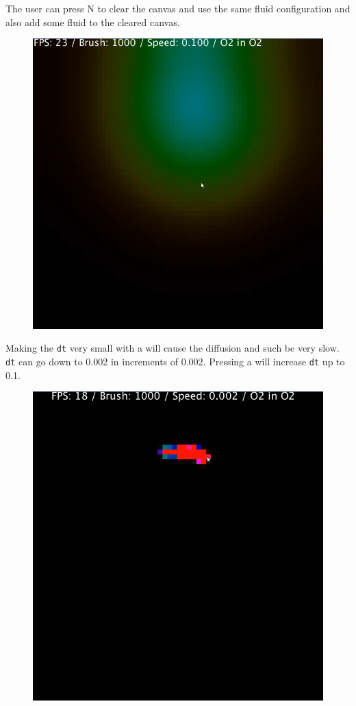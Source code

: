 \documentclass[12pt,a4paper]{book}
\begin{document}
\pagebreak
The user can press N to clear the canvas and use the same fluid configuration and also add some fluid to the cleared canvas.

\begin{figure}[H]
	\includegraphics[scale=0.5]{pics/9.png}
\end{figure}

\pagebreak
Making the \verb|dt| very small with a will cause the diffusion and such be very slow. \verb|dt| can go down to 0.002 in increments of 0.002. Pressing a will increase \verb|dt| up to 0.1.

\begin{figure}[H]
	\includegraphics[scale=0.5]{pics/10.png}
\end{figure}
\end{document}
